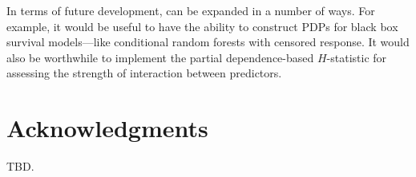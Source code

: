 In terms of future development,  can be expanded in a number of ways. For example, it would be useful to have the ability to construct PDPs for black box survival models---like conditional random forests with censored response. It would also be worthwhile to implement the partial dependence-based $H$-statistic \citep{friedman-2008-predictive} for assessing the strength of interaction between predictors.


\section{Acknowledgments}

TBD.





\address{Brandon M. Greenwell\\
  Infoscitex, a DCS Corporation\\
  4027 Colonel Glenn Highway\\
  Suite 210\\
  Dayton, OH 45431-1672\\
  United States of America\\}
